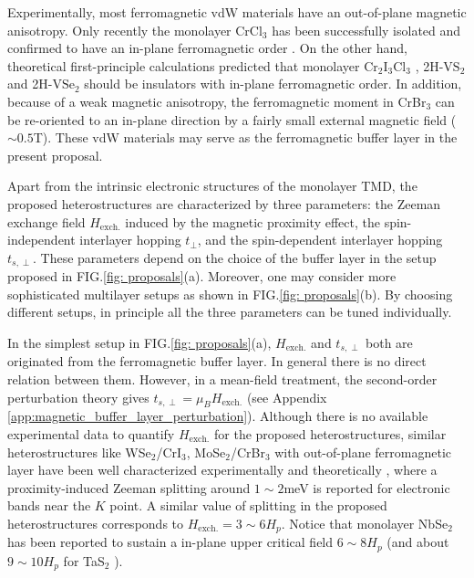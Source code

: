 Experimentally, most ferromagnetic vdW materials have an out-of-plane magnetic anisotropy. Only recently the monolayer CrCl$_3$ has been successfully isolated and confirmed to have an in-plane ferromagnetic order \cite{cai2019atomically,lu2020meron}. On the other hand, theoretical first-principle calculations predicted that monolayer $\mathrm{Cr_2I_3Cl_3}$ \cite{zhang2020electronic}, 2H-$\mathrm{VS_2}$ \cite{fuh2016newtype} and 2H-$\mathrm{VSe_2}$ \cite{zhang2019magnetic,kezilebieke2020electronic} should be insulators with in-plane ferromagnetic order. In addition, because of a weak magnetic anisotropy, the ferromagnetic moment in CrBr$_3$ can be re-oriented to an in-plane direction by a fairly small external magnetic field ($\sim 0.5$T)\cite{aikebaier2022controlling}. These vdW materials may serve as the ferromagnetic buffer layer in the present proposal.

Apart from the intrinsic electronic structures of the monolayer TMD, the proposed heterostructures are characterized by three parameters: the Zeeman exchange field $H_{\text{exch.}}$ induced by the magnetic proximity effect, the spin-independent interlayer hopping $t_\perp$, and the spin-dependent interlayer hopping $t_{s,\perp}$. These parameters depend on the choice of the buffer layer in the setup proposed in FIG.\ref{fig: proposals}(a). Moreover, one may consider more sophisticated multilayer setups as shown in FIG.\ref{fig: proposals}(b). By choosing different setups, in principle all the three parameters can be tuned individually.

In the simplest setup in FIG.\ref{fig: proposals}(a), $H_{\text{exch.}}$ and $t_{s,\perp}$ both are originated from the ferromagnetic buffer layer. In general there is no direct relation between them. However, in a mean-field treatment, the second-order perturbation theory gives $t_{s,\perp}=\mu_B H_{\text{exch.}}$ (see Appendix \ref{app:magnetic_buffer_layer_perturbation}). Although there is no available experimental data to quantify $H_{\text{exch.}}$ for the proposed heterostructures, similar heterostructures like WSe$_2$/CrI$_3$, MoSe$_2$/CrBr$_3$ with out-of-plane ferromagnetic layer have been well characterized experimentally and theoretically \cite{zhong2017van,zhong2020layer,seyler2018valley,zollner2019proximity,ciorciaro2020observation,aikebaier2022controlling}, where a proximity-induced Zeeman splitting around $1\sim2$meV is reported for electronic bands near the $K$ point. A similar value of splitting in the proposed heterostructures corresponds to $H_{\text{exch.}}=3\sim6 H_p$. Notice that monolayer NbSe$_2$ has been reported to sustain a in-plane upper critical field $6\sim 8  H_p$ \cite{xi2016ising,xing2017ising,de2018tuning} (and about $9\sim10 H_p$ for TaS$_2$ \cite{navarro2016enhanced,pan2017enhanced}).

